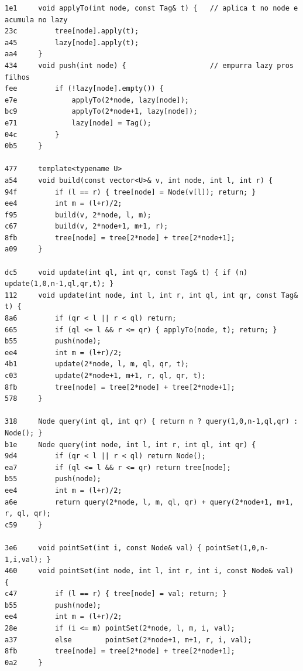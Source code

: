 \documentclass[11pt, a4paper, twoside]{article}
\begin{document}
\begin{lstlisting}
1e1     void applyTo(int node, const Tag& t) {   // aplica t no node e acumula no lazy
23c         tree[node].apply(t);
a45         lazy[node].apply(t);
aa4     }
434     void push(int node) {                    // empurra lazy pros filhos
fee         if (!lazy[node].empty()) {
e7e             applyTo(2*node, lazy[node]);
bc9             applyTo(2*node+1, lazy[node]);
e71             lazy[node] = Tag();
04c         }
0b5     }
    
477     template<typename U>
a54     void build(const vector<U>& v, int node, int l, int r) {
94f         if (l == r) { tree[node] = Node(v[l]); return; }
ee4         int m = (l+r)/2;
f95         build(v, 2*node, l, m);
c67         build(v, 2*node+1, m+1, r);
8fb         tree[node] = tree[2*node] + tree[2*node+1];
a09     }
    
dc5     void update(int ql, int qr, const Tag& t) { if (n) update(1,0,n-1,ql,qr,t); }
112     void update(int node, int l, int r, int ql, int qr, const Tag& t) {
8a6         if (qr < l || r < ql) return;
665         if (ql <= l && r <= qr) { applyTo(node, t); return; }
b55         push(node);
ee4         int m = (l+r)/2;
4b1         update(2*node, l, m, ql, qr, t);
c03         update(2*node+1, m+1, r, ql, qr, t);
8fb         tree[node] = tree[2*node] + tree[2*node+1];
578     }
    
318     Node query(int ql, int qr) { return n ? query(1,0,n-1,ql,qr) : Node(); }
b1e     Node query(int node, int l, int r, int ql, int qr) {
9d4         if (qr < l || r < ql) return Node();
ea7         if (ql <= l && r <= qr) return tree[node];
b55         push(node);
ee4         int m = (l+r)/2;
a6e         return query(2*node, l, m, ql, qr) + query(2*node+1, m+1, r, ql, qr);
c59     }
    
3e6     void pointSet(int i, const Node& val) { pointSet(1,0,n-1,i,val); }
460     void pointSet(int node, int l, int r, int i, const Node& val) {
c47         if (l == r) { tree[node] = val; return; }
b55         push(node);
ee4         int m = (l+r)/2;
28e         if (i <= m) pointSet(2*node, l, m, i, val);
a37         else        pointSet(2*node+1, m+1, r, i, val);
8fb         tree[node] = tree[2*node] + tree[2*node+1];
0a2     }
    

\end{lstlisting}
\end{document}
